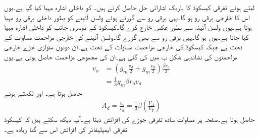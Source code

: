 لیتے  ہوئے تفرقی کیسکوڈ کا باریک اشاراتی حل حاصل کرتے ہیں۔ کو  داخلی اشارہ مہیا کیا گیا ہے۔یوں اس کا خارجی برقی رو  ہو گا۔یہی برقی رو  سے گزرتے ہوئے ولسن آئینے کو بطور داخلی برقی رو مہیا ہوتا ہے۔یوں ولسن آئینہ  سے   بطور عکس خارج کرے گا۔کیسکوڈ کے دوسری جانب  کو  داخلی اشارہ مہیا کیا جاتا ہے۔یوں  ہو گا۔یہی برقی رو  سے بھی گزرے گا۔ولسن آئینے کی خارجی مزاحمت مساوات  کے تحت  ہے جبکہ کیسکوڈ کی خارجی مزاحمت مساوات  کے تحت  ہے۔ان دونوں متوازی جڑے خارجی مزاحمتوں کی نشاندہی شکل   ب میں کی گئی ہے۔ان کی مجموعی مزاحمت  حاصل ہوتی ہے۔یوں
\begin{align*}
v_o&=\left(g_m \frac{v_d}{2}+g_m \frac{v_d}{2} \right) \frac{\beta r_o}{3}\\
&=\frac{1}{3} g_m \beta r_o v_d
\end{align*}
حاصل ہوتا ہے۔ اور  لکھتے ہوئے
\begin{align}
A_d=\frac{v_o}{v_d}=\frac{1}{3} \beta \left(\frac{V_A}{V_T} \right)
\end{align}
حاصل ہوتا ہے۔صفحہ  پر مساوات  سادہ تفرقی جوڑے کی افزائش دیتا ہے۔آپ دیکھ سکتے ہیں کہ کیسکوڈ تفرقی ایمپلیفائر کی افزائش  اس سے  گنا زیادہ ہے۔

